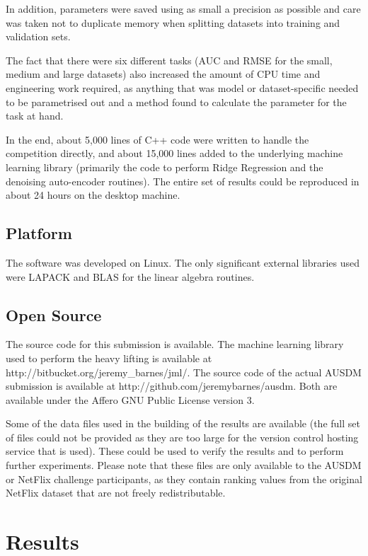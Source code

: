 \documentclass{article}
\begin{document}
In addition, parameters were saved using as small a precision as possible and care was taken not to duplicate memory when splitting datasets into training and validation sets.

The fact that there were six different tasks (AUC and RMSE for the small, medium and large datasets) also increased the amount of CPU time and engineering work required, as anything that was model or dataset-specific needed to be parametrised out and a method found to calculate the parameter for the task at hand.

In the end, about 5,000 lines of C++ code were written to handle the competition directly, and about 15,000 lines added to the underlying machine learning library (primarily the code to perform Ridge Regression and the denoising auto-encoder routines).  The entire set of results could be reproduced in about 24 hours on the desktop machine.

\subsection{Platform}

The software was developed on Linux.  The only significant external libraries used were LAPACK and BLAS for the linear algebra routines.

\subsection{Open Source}

The source code for this submission is available.  The machine learning library used to perform the heavy lifting is available at http://bitbucket.org/jeremy\_barnes/jml/.  The source code of the actual AUSDM submission is available at http://github.com/jeremybarnes/ausdm.  Both are available under the Affero GNU Public License version 3.

Some of the data files used in the building of the results are available (the full set of files could not be provided as they are too large for the version control hosting service that is used).  These could be used to verify the results and to perform further experiments.  Please note that these files are only available to the AUSDM or NetFlix challenge participants, as they contain ranking values from the original NetFlix dataset that are not freely redistributable.

\section{Results}
\end{document}
